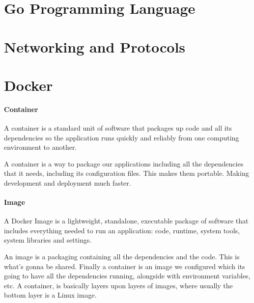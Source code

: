 \documentclass[a4paper]{article}
\begin{document}
    \section{Go Programming Language}
    \subsection{}
    \subsection{}

    \newpage
    \section{Networking and Protocols}
    \subsection{}
    \subsection{}

    \newpage
    \section{Docker}
    \paragraph{Container} A container is a standard unit of software that packages up code and all its dependencies so the application runs quickly and reliably from one computing environment to another.

    A container is a way to package our applications including all the dependencies that it needs, including its configuration files. This makes them portable. Making development and deployment much faster. 

    \paragraph*{Image} A Docker Image is a lightweight, standalone, executable package of software that includes everything needed to run an application: code, runtime, system tools, system libraries and settings.

    An image is a packaging containing all the dependencies and the code. This is what's gonna be shared. Finally a container is an image we configured which its going to have all the dependencies running, alongside with environment variables, etc. A container, is basically layers upon layers of images, where usually the bottom layer is a Linux image. 
\end{document}
